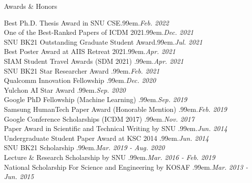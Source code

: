 \documentclass{resume} %
\makeatletter
\newcommand \Dotfill {\leavevmode \cleaders \hb@xt@ .99em{\hss .\hss }\hfill \kern \z@}
\makeatother
\begin{document}
\begin{rSection}{Awards \& Honors}

Best Ph.D. Thesis Award in SNU CSE\smallskip \Dotfill \emph{Feb. 2022} \\ 
One of the Best-Ranked Papers of ICDM 2021\smallskip \Dotfill \emph{Dec. 2021} \\ 
SNU BK21 Outstanding Graduate Student Award\smallskip \Dotfill \emph{Jul. 2021} \\ 
Best Poster Award at AIIS Retreat 2021\smallskip \Dotfill \emph{Apr. 2021} \\ 
SIAM Student Travel Awards (SDM 2021) \smallskip \Dotfill \emph{Apr. 2021} \\ 
SNU BK21 Star Researcher Award \smallskip \Dotfill \emph{Feb. 2021} \\ 
Qualcomm Innovation Fellowship \smallskip \Dotfill \emph{Dec. 2020} \\ 
Yulchon AI Star Award \smallskip \Dotfill \emph{Sep. 2020} \\ 
Google PhD Fellowship (Machine Learning) \smallskip \Dotfill \emph{Sep. 2019} \\ 
Samsung HumanTech Paper Award (Honorable Mention) \smallskip \Dotfill \emph{Feb. 2019} \\ 
Google Conference Scholarships (ICDM 2017) \smallskip \Dotfill \emph{Nov. 2017} \\ 
Paper Award in Scientific and Technical Writing by SNU \smallskip \Dotfill \emph{Jun. 2014} \\ 
Undergraduate Student Paper Award at KSC 2014 \smallskip \Dotfill \emph{Jun. 2014} \\
SNU BK21 Scholarship \smallskip \Dotfill \emph{Mar. 2019 - Aug. 2020} \\ 
Lecture \& Research Scholarship by SNU \smallskip \Dotfill \emph{Mar. 2016 - Feb. 2019} \\
National Scholarship For Science and Engineering by KOSAF \smallskip \Dotfill \emph{Mar. 2013 - Jun. 2015}

\end{rSection}

\end{document}
